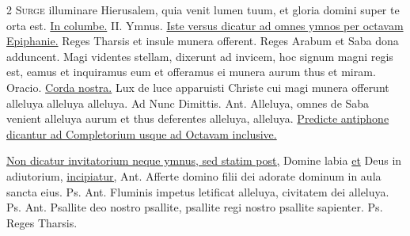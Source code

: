 \begin{multicols*}{2}
\lettrine[lines=2]{\zallmancaps \color{Red} S}{urge} \hypertarget{surge-capitulum}{illuminare} Hierusalem, quia venit lumen tuum, et gloria domini super te orta est. \R \hyperlink{in-columbe}{In columbe.} {\color{Red} II. Ymnus.}
\newline \ul{Iste versus dicatur ad omnes ymnos per octavam Epiphanie.}
\newline \V Reges Tharsis et insule munera offerent.
\newline \R Reges Arabum et Saba dona adduncent.
 Magi videntes stellam, dixerunt ad invicem, hoc signum magni regis est, eamus et inquiramus eum et offeramus ei munera aurum thus et miram. {\color{Red} Oracio.} \hyperlink{corda-nostra-vigilia-epiphanie}{Corda nostra.}
 Lux de luce apparuisti Christe cui magi munera offerunt alleluya alleluya alleluya. {\color{Red} Ad Nunc Dimittis. Ant.} Alleluya, omnes de Saba venient alleluya aurum et thus deferentes alleluya, alleluya.
\newline \ul{Predicte antiphone dicantur ad Completorium usque ad Octavam inclusive.}
{\color{Red} }
\par \noindent \ul{Non dicatur invitatorium neque ymnus, sed statim post,} Domine labia \ul{et} Deus in adiutorium, \ul{incipiatur,} {\color{Red} Ant.} Afferte domino filii dei adorate dominum in aula sancta eius. {\color{Red} Ps.}  {\color{Red} Ant.} Fluminis impetus letificat alleluya, civitatem dei alleluya. {\color{Red} Ps.}  {\color{Red} Ant.} Psallite deo nostro psallite, psallite regi nostro psallite sapienter. {\color{Red} Ps.}  \V Reges Tharsis.

\end{multicols*}
